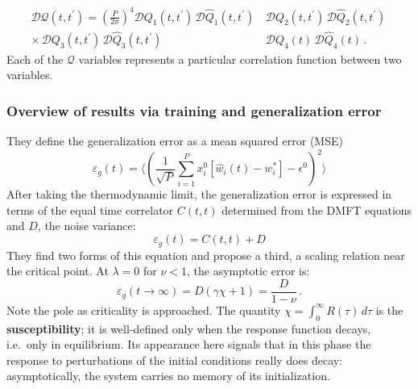 \documentclass[11pt]{article}
\begin{document}
\begin{equation}
\begin{aligned}
\mathcal{D} \mathcal{Q}(t,t^{\prime}) = \left(\frac{P}{2\pi}\right)^4 \mathcal{D} Q_1(t, t^{\prime})\, \mathcal{D} \hat{Q}_1(t, t^{\prime})\, &\mathcal{D} Q_2(t, t^{\prime})\, \mathcal{D} \hat{Q}_2(t, t^{\prime})\, \\ \times\, \mathcal{D} Q_3(t, t^{\prime})\, \mathcal{D} \hat{Q}_3(t, t^{\prime})\, &\mathcal{D} Q_4(t)\, \mathcal{D} \hat{Q}_4(t)\,.
\end{aligned}
\end{equation}
Each of the $\mathcal{Q}$ variables represents a particular correlation function between two variables.

\subsubsection{Overview of results via training and generalization error}

They define the generalization error as a {mean squared error (MSE)}  
\begin{equation}
    \varepsilon_g(t) = \langle \left(\frac{1}{\sqrt{P}} \sum_{i=1}^P x_i^0[\hat{w}_i(t)-w^*_i]-\epsilon^0\right)^2 \rangle 
\end{equation}
%
%
After taking the thermodynamic limit, the generalization error is expressed in terms of the equal time correlator $C(t,t)$ determined from the DMFT equations and $D$, the noise variance:
\begin{equation}
    \varepsilon_g(t) = C(t, t)+D
\end{equation}
%
%
They find two forms of this equation and propose a third, a scaling relation near the critical point.
At $\lambda=0$ for  $\nu<1$, the asymptotic error is:
\begin{equation}
\varepsilon_g(t\to\infty)=D(\gamma \chi+1) = \frac{D}{1-\nu}\,.
\label{alpha<1ge}
\end{equation} 
Note the pole as criticality is approached. The quantity $\chi=\int_0^{\infty}R(\tau)\,d\tau$ is the \textbf{susceptibility}; it is well-defined only when the response function decays, i.e.\ only in equilibrium. Its appearance here signals that in this phase the response to perturbations of the initial conditions really does decay: asymptotically, the system carries no memory of its initialization.
\end{document}
